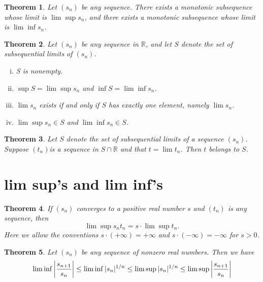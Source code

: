 \documentclass[12pt, lettersize]{book}
\theoremstyle{plain}
\newtheorem{thm}{Theorem}[section]
\theoremstyle{definition}
\theoremstyle{remark}
\begin{document}
		\setcounter{equation}{0}
		\begin{thm}\label{def:subsequence with limit limsup or liminf}
			Let $(s_n)$ be any sequence. There exists a monotonic subsequence whose limit is $\lim\sup s_n$, and there exists a monotonic subsequence whose limit is $\lim\inf s_n$.
		\end{thm}
		
		\begin{thm}\label{def:subsequential limit condition}
			Let $(s_n)$ be any sequence in $\mathbb{R}$, and let $S$ denote the set of subsequential limits of $(s_n)$.
			\begin{enumerate}[(i)]
				\item S is nonempty.
				\item $\sup S=\lim\sup s_n$ and $\inf S=\lim\inf s_n$.
				\item $\lim s_n$ exists if and only if $S$ has exactly one element, namely $\lim s_n$.
				\item $\lim\sup s_n\in S$ and $\lim\inf s_n\in S$.
			\end{enumerate}
		\end{thm}
		
		\begin{thm}
			Let $S$ denote the set of subsequential limits of a sequence $(s_n)$. Suppose $(t_n)$is a sequence in $S\cap\mathbb{R}$ and that $t=\lim t_n$. Then $t$ belongs to $S$.
		\end{thm}
	
		\newpage
		
	\section{lim sup's and lim inf's}
		\setcounter{equation}{0}
		\begin{thm}\label{thm:12.1}
		If $(s_n)$ converges to a positive real number $s$ and $(t_n)$ is any sequence, then
		\begin{displaymath}
			\lim\sup s_nt_n=s\cdot\lim\sup t_n.
		\end{displaymath}
		Here we allow the conventions $s\cdot(+\infty)=+\infty$ and $s\cdot(-\infty)=-\infty$ for $s>0$.
		\end{thm}
		
		\setcounter{equation}{0}
		\begin{thm}\label{thm:12.2}
		Let $(s_n)$ be any sequence of nonzero real numbers. Then we have
		\begin{displaymath}
		\lim\inf\abs{\frac{s_{n+1}}{s_n}}\leq\lim\inf|s_n|^{1/n}\leq\lim\sup|s_n|^{1/n}\leq\lim\sup\abs{\frac{s_{n+1}}{s_n}}
		\end{displaymath}
		\end{thm}
		
\end{document}
